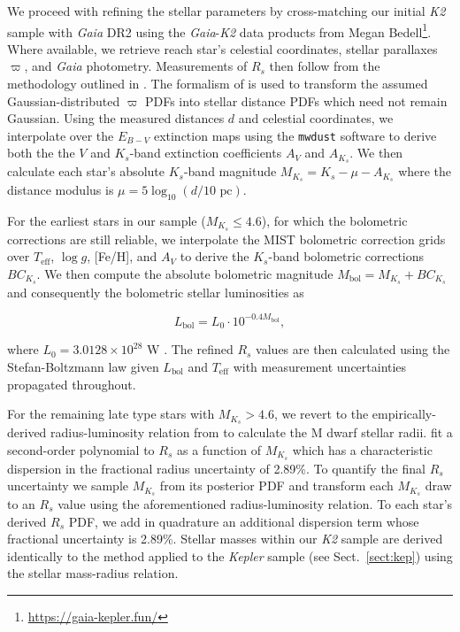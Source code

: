 \documentclass[twocolumn]{emulateapj}
\newcommand{\gaia}[1]{\emph{Gaia}#1}
\newcommand{\kepler}[1]{\emph{Kepler}#1}
\newcommand{\ktwo}[1]{\emph{K2}#1}
\newcommand{\teff}[1]{$T_{\text{eff}}$#1}
\newcommand{\logg}[1]{$\log{g}$#1}
\begin{document}
We proceed with refining the stellar parameters by cross-matching our initial \ktwo{} sample with \gaia{}  
DR2 using the \gaia{-}\ktwo{} data products from Megan Bedell\footnote{\url{https://gaia-kepler.fun/}}. Where
available, we retrieve reach star's celestial coordinates, stellar parallaxes $\varpi$, and \gaia{} photometry.
Measurements of $R_s$ then follow from the methodology
outlined in \cite{berger18}. The formalism of \cite{bailerjones18} is used to transform the assumed
Gaussian-distributed $\varpi$ PDFs into stellar distance PDFs which need not remain Gaussian.
Using the measured distances $d$ and celestial coordinates, we interpolate over the $E_{B-V}$ extinction maps using the
\texttt{mwdust} software \citep{bovy16} to derive both the the $V$ and $K_s$-band extinction coefficients $A_V$ and
$A_{K_s}$. We then calculate each star's absolute $K_s$-band magnitude $M_{K_s} = K_s - \mu - A_{K_s}$ where
the distance modulus is $\mu = 5\log_{10}(d/10\text{ pc})$.

For the earliest stars in our sample ($M_{K_s}\leq 4.6$), for which the bolometric corrections
are still reliable, we interpolate the MIST bolometric correction grids \citep{choi16} over \teff{,} \logg{,} [Fe/H],
and $A_V$ to derive the $K_s$-band bolometric corrections $BC_{K_s}$. We then compute the
absolute bolometric magnitude $M_{\text{bol}}=M_{K_s} + BC_{K_s}$ and consequently the bolometric stellar
luminosities as 

\begin{equation}
  L_{\text{bol}} = L_0 \cdot 10^{-0.4 M_{\text{bol}}},
\end{equation}

\noindent where $L_0 = 3.0128 \times 10^{28}$ W \citep{mamajek15}. The refined $R_s$ values
are then calculated using the Stefan-Boltzmann law given $L_{\text{bol}}$ and \teff{} with measurement uncertainties
propagated throughout.

For the remaining late type stars with $M_{K_s}>4.6$, we revert to the empirically-derived radius-luminosity relation
from \cite{mann15} to calculate the M dwarf stellar radii. \cite{mann15} fit a second-order polynomial to $R_s$ as
a function of $M_{K_s}$ which has a characteristic dispersion in the fractional radius uncertainty of 2.89\%. To quantify
the final $R_s$ uncertainty we sample $M_{K_s}$ from its posterior PDF and transform each $M_{K_s}$ draw to an $R_s$ value
using the aforementioned radius-luminosity relation. To each star's derived $R_s$ PDF, we add in quadrature an additional
dispersion term whose fractional uncertainty is 2.89\%. Stellar masses within our \ktwo{} sample are derived
identically to the method applied to the \kepler{} sample (see Sect.~\ref{sect:kep}) using the \cite{boyajian12} stellar
mass-radius relation. 
\end{document}
